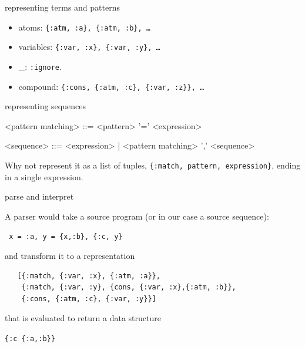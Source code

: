 \begin{frame}[fragile]{representing terms and patterns}

\pause\vspace{20pt}
\begin{itemize}
 \pause \item atoms: {\tt \{:atm, :a\}, \{:atm, :b\}, \ldots} 
 \pause \item variables: {\tt \{:var, :x\}, \{:var, :y\}, \ldots} 
 \pause \item \_:  \verb+:ignore+.
 \pause \item compound: {\tt \{:cons, \{:atm, :c\}, \{:var, :z\}\}, \ldots}
\end{itemize}

\end{frame}

\begin{frame}[fragile]{representing sequences}

\begin{grammar}
<pattern matching> ::=  <pattern> '=' <expression>

<sequence> ::=  <expression> | <pattern matching> ',' <sequence>
\end{grammar}

\pause\vspace{20pt} Why not represent it as a list of tuples, \verb+{:match, pattern, expression}+, ending in a single expression.

\end{frame}

\begin{frame}[fragile]{parse and interpret}

\pause A parser would take a source program (or in our case a source sequence):

\pause\vspace{10pt}\hspace{40pt}\verb+ x = :a, y = {x,:b}, {:c, y}+

\pause \vspace{10pt} and transform it to a representation

\pause\vspace{10pt}
\begin{verbatim}
   [{:match, {:var, :x}, {:atm, :a}}, 
    {:match, {:var, :y}, {cons, {:var, :x},{:atm, :b}}, 
    {:cons, {:atm, :c}, {:var, :y}}]
\end{verbatim}
\pause \vspace{10pt} that is evaluated to return a data structure

\pause\vspace{10pt}\hspace{40pt}\verb+{:c {:a,:b}}+

\end{frame}


